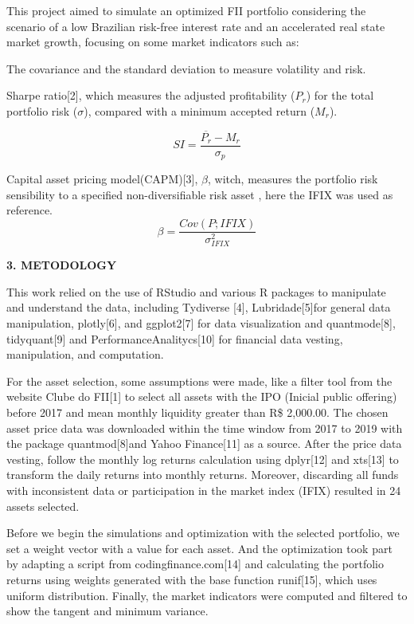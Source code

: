 \documentclass[
]{article}
\begin{document}
This project aimed to simulate an optimized FII portfolio considering
the scenario of a low Brazilian risk-free interest rate and an
accelerated real state market growth, focusing on some market indicators
such as:

The covariance and the standard deviation to measure volatility and
risk.

Sharpe ratio{[}2{]}, which measures the adjusted profitability (\(P_r\))
for the total portfolio risk (\(\sigma\)), compared with a minimum
accepted return (\(M_r\)).

\[ SI=\frac{\overline{P_r}-M_r}{\sigma_{p}} \]

Capital asset pricing model(CAPM){[}3{]}, \(\beta\), witch, measures the
portfolio risk sensibility to a specified non-diversifiable risk asset ,
here the IFIX was used as
reference.\[\beta=\frac{Cov(P;IFIX)}{\sigma_{IFIX}^2}\]

\begin{center}
\textbf{3. METODOLOGY}
\end{center}

This work relied on the use of RStudio and various R packages to
manipulate and understand the data, including Tydiverse {[}4{]},
Lubridade{[}5{]}for general data manipulation, plotly{[}6{]}, and
ggplot2{[}7{]} for data visualization and quantmode{[}8{]},
tidyquant{[}9{]} and PerformanceAnalitycs{[}10{]} for financial data
vesting, manipulation, and computation.

For the asset selection, some assumptions were made, like a filter tool
from the website Clube do FII{[}1{]} to select all assets with the IPO
(Inicial public offering) before 2017 and mean monthly liquidity greater
than R\$ 2,000.00. The chosen asset price data was downloaded within the
time window from 2017 to 2019 with the package quantmod{[}8{]}and Yahoo
Finance{[}11{]} as a source. After the price data vesting, follow the
monthly log returns calculation using dplyr{[}12{]} and xts{[}13{]} to
transform the daily returns into monthly returns. Moreover, discarding
all funds with inconsistent data or participation in the market index
(IFIX) resulted in 24 assets selected.

Before we begin the simulations and optimization with the selected
portfolio, we set a weight vector with a value for each asset. And the
optimization took part by adapting a script from
codingfinance.com{[}14{]} and calculating the portfolio returns using
weights generated with the base function runif{[}15{]}, which uses
uniform distribution. Finally, the market indicators were computed and
filtered to show the tangent and minimum variance.
\end{document}
